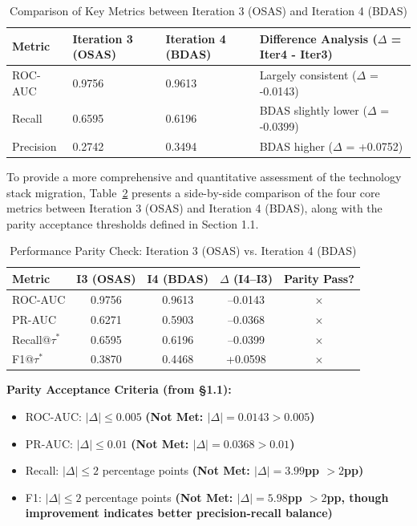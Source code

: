 \documentclass[sigplan,screen]{acmart}
\begin{document}
\begin{table}[h]
\centering
\caption{Comparison of Key Metrics between Iteration 3 (OSAS) and Iteration 4 (BDAS)}
\label{tab:osas-bdas-comparison}
\begin{tabular}{|p{3cm}|p{3.5cm}|p{3.5cm}|p{5cm}|}
\hline
\textbf{Metric} & \textbf{Iteration 3 (OSAS)} & \textbf{Iteration 4 (BDAS)} & \textbf{Difference Analysis ($\Delta$ = Iter4 - Iter3)} \\
\hline
ROC-AUC & 0.9756 & 0.9613 & Largely consistent ($\Delta$ = -0.0143) \\
\hline
Recall & 0.6595 & 0.6196 & BDAS slightly lower ($\Delta$ = -0.0399) \\
\hline
Precision & 0.2742 & 0.3494 & BDAS higher ($\Delta$ = +0.0752) \\
\hline
\end{tabular}
\end{table}

To provide a more comprehensive and quantitative assessment of the technology stack migration, Table~\ref{tab:parity-check} presents a side-by-side comparison of the four core metrics between Iteration 3 (OSAS) and Iteration 4 (BDAS), along with the parity acceptance thresholds defined in Section 1.1.

\begin{table}[h]
\centering
\caption{Performance Parity Check: Iteration 3 (OSAS) vs. Iteration 4 (BDAS)}
\label{tab:parity-check}
\begin{tabular}{|l|c|c|c|c|}
\hline
\textbf{Metric} & \textbf{I3 (OSAS)} & \textbf{I4 (BDAS)} & \textbf{$\Delta$ (I4--I3)} & \textbf{Parity Pass?} \\
\hline
ROC-AUC & 0.9756 & 0.9613 & --0.0143 & $\times$ \\
\hline
PR-AUC & 0.6271 & 0.5903 & --0.0368 & $\times$ \\
\hline
Recall@$\tau^*$ & 0.6595 & 0.6196 & --0.0399 & $\times$ \\
\hline
F1@$\tau^*$ & 0.3870 & 0.4468 & +0.0598 & $\times$ \\
\hline
\end{tabular}
\end{table}

\textbf{Parity Acceptance Criteria (from §1.1):}
\begin{itemize}
\item ROC-AUC: $|\Delta| \leq 0.005$ \textbf{(Not Met: $|\Delta|=0.0143 > 0.005$)}
\item PR-AUC: $|\Delta| \leq 0.01$ \textbf{(Not Met: $|\Delta|=0.0368 > 0.01$)}
\item Recall: $|\Delta| \leq 2$ percentage points \textbf{(Not Met: $|\Delta|=3.99$pp $> 2$pp)}
\item F1: $|\Delta| \leq 2$ percentage points \textbf{(Not Met: $|\Delta|=5.98$pp $> 2$pp, though improvement indicates better precision-recall balance)}
\end{itemize}
\end{document}

